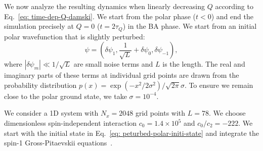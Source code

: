 We now analyze the resulting dynamics when linearly decreasing $Q$ according to
Eq.~\eqref{eq: time-dep-Q-damski}.
We start from the polar phase ($t < 0$) and end the simulation precisely at
$Q=0$ ($t=2\tau_Q$) in the BA phase.
We start from an initial polar wavefunction that is slightly perturbed:
\begin{equation}
    \psi = \left(\delta\psi_1, \frac{1}{\sqrt{L}} + \delta\psi_0,
    \delta\psi_{-1}\right),
    \label{eq: peturbed-polar-initi-state}
\end{equation}
where $|\delta\psi_m| \ll 1 / \sqrt{L}$ are small noise terms and $L$ is the
length.
The real and imaginary parts of these terms at individual grid points are drawn
from the probability distribution
$p(x) = \exp(-x^2/2\sigma^2)/\sqrt{2\pi}\sigma$.
To ensure we remain close to the polar ground state, we take $\sigma=10^{-4}$.

We consider a 1D system with $N_x = 2048$ grid points with $L=78$.
We choose dimensionless spin-independent interaction $c_0=1.4\times10^5$ and 
$c_0/c_2 = -222$.
We start with the initial state in Eq.~\eqref{eq: peturbed-polar-initi-state}
and integrate the spin-1 Gross-Pitaevskii equations~\cite{Symes2016}.

